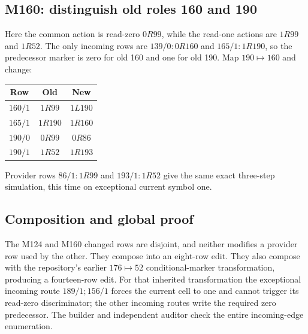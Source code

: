 \documentclass[11pt,a4paper]{article}
\theoremstyle{definition}
\numberwithin{equation}{section}
\begin{document}
\subsection{M160: distinguish old roles 160 and 190}

Here the common action is read-zero $0R99$, while the read-one actions
are $1R99$ and $1R52$. The only incoming rows are
$139/0:0R160$ and $165/1:1R190$, so the predecessor marker is zero
for old 160 and one for old 190. Map $190\mapsto160$ and change:
\begin{center}
\begin{tabular}{ccc}
\toprule
Row & Old & New\\
\midrule
$160/1$ & $1R99$ & $1L190$\\
$165/1$ & $1R190$ & $1R160$\\
$190/0$ & $0R99$ & $0R86$\\
$190/1$ & $1R52$ & $1R193$\\
\bottomrule
\end{tabular}
\end{center}
Provider rows $86/1:1R99$ and $193/1:1R52$ give the same exact
three-step simulation, this time on exceptional current symbol one.

\subsection{Composition and global proof}

The M124 and M160 changed rows are disjoint, and neither modifies a
provider row used by the other. They compose into an eight-row edit.
They also compose with the repository's earlier $176\mapsto52$
conditional-marker transformation, producing a fourteen-row edit.
For that inherited transformation the exceptional incoming route
$189/1;156/1$ forces the current cell to one and cannot trigger its
read-zero discriminator; the other incoming routes write the required
zero predecessor. The builder and independent auditor check the entire
incoming-edge enumeration.
\end{document}
